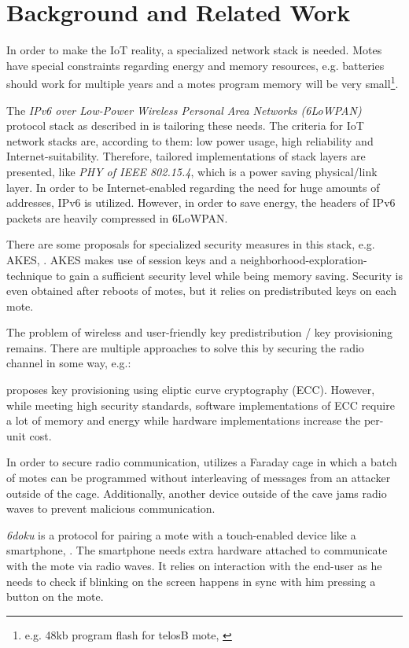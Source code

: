 \documentclass{sig-alternate} %
\begin{document}
\section{Background and Related Work}
\label{sec:related_work}

In order to make the IoT reality, a specialized network stack is needed.
Motes have special constraints regarding energy and memory resources, e.g. batteries should work for multiple years and a motes program memory will be very small\footnote{e.g. 48kb program flash for telosB mote, \cite{telosb}}.

The \textit{IPv6 over Low-Power Wireless Personal Area Networks (6LoWPAN)} protocol stack as described in \cite{palattella2013standardized} is tailoring these needs.
The criteria for IoT network stacks are, according to them: low power usage, high reliability and Internet-suitability.
Therefore, tailored implementations of stack layers are presented, like \textit{PHY of IEEE 802.15.4}, which is a power saving physical/link layer.
In order to be Internet-enabled regarding the need for huge amounts of addresses, IPv6 is utilized.
However, in order to save energy, the headers of IPv6 packets are heavily compressed in 6LoWPAN.

There are some proposals for specialized security measures in this stack, e.g. AKES, \cite{krentz15akes}.
AKES makes use of session keys and a neighborhood-exploration-technique to gain a sufficient security level while being memory saving.
Security is even obtained after reboots of motes, but it relies on predistributed keys on each mote.

The problem of wireless and user-friendly key predistribution / key provisioning remains.
There are multiple approaches to solve this by securing the radio channel in some way, e.g.:

\cite{chen2011over} proposes key provisioning using eliptic curve cryptography (ECC).
However, while meeting high security standards, software implementations of ECC require a lot of memory and energy while hardware implementations increase the per-unit cost.

In order to secure radio communication, \cite{kuo2007message} utilizes a Faraday cage in which a batch of motes can be programmed without interleaving of messages from an attacker outside of the cage.
Additionally, another device outside of the cave jams radio waves to prevent malicious communication.

\textit{6doku} is a protocol for pairing  a mote with a touch-enabled device like a smartphone, \cite{krentz20156doku}.
The smartphone needs extra hardware attached to communicate with the mote via radio waves.
It relies on interaction with the end-user as he needs to check if blinking on the screen happens in sync with him pressing a button on the mote.
\end{document}
